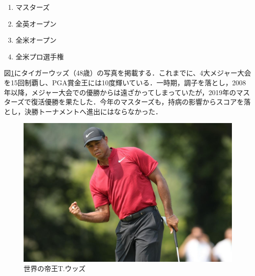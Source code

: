 \documentclass[a4j, twocolumn]{jarticle}
\begin{document}
\begin{enumerate}
    \item マスターズ
    \item 全英オープン
    \item 全米オープン
    \item 全米プロ選手権
\end{enumerate}

図\ref{tigerimg}にタイガーウッズ（48歳）の写真を掲載する．これまでに、4大メジャー大会を15回制覇し、PGA賞金王には10度輝いている．一時期，調子を落とし，2008年以降，メジャー大会での優勝からは遠ざかってしまっていたが，2019年のマスターズで復活優勝を果たした．今年のマスターズも，持病の影響からスコアを落とし，決勝トーナメントへ進出にはならなかった．\\

\begin{figure}
    \begin{center}
        \includegraphics[scale=0.1]{tiger.jpg}
        \vspace{-5mm}
        \caption{世界の帝王T.ウッズ}
        \label{tigerimg}
    \end{center}
\end{figure}
\end{document}
